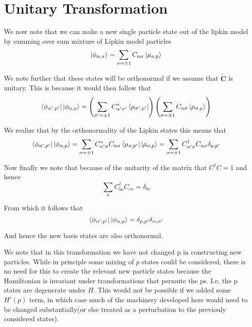 \documentclass[11pt]{article} %
\begin{document}
\section{Unitary Transformation}

We now note that we can make a new single particle state out of the lipkin model by summing over sum mixture of Lipkin model particles\\

\begin{equation} \ket{\phi_{\alpha,\sigma}}=\sum_{\sigma=\pm 1} C_{\alpha \sigma} \ket{\mu_{\sigma,p}}\end{equation}

We note further that these states will be orthonormal if we assume that $\mathbf{\tilde{C}}$ is unitary. This is because it would then follow that\\

\begin{equation}
\bra{\phi_{\alpha',p'}}\ket{\phi_{\alpha,p}}=\left(\sum_{\sigma'=\pm 1} C_{\alpha' \sigma'}^*\bra{\mu_{\sigma',p'}}\right)\left(\sum_{\sigma=\pm 1} C_{\alpha \sigma}\ket{\mu_{\sigma,p}}\right)\end{equation}

We realize that by the orthonormality of the Lipkin states this means that\\
\begin{equation}
\bra{\phi_{\alpha',p'}}\ket{\phi_{\alpha,p}}= \sum_{\sigma=\pm 1} C_{\alpha' \sigma}^* C_{\alpha \sigma} \bra{\mu_{\sigma,p'}} \ket{\mu_{\sigma,p}}=\sum_{\sigma=\pm 1} C_{\alpha' \sigma}^\dagger C_{\alpha \sigma} \delta_{p,p'}\end{equation}

Now finally we note that because of the unitarity of the matrix that $C^\dagger C=1$ and hence \\
\begin{equation} \sum_a C_{ b a}^\dagger C_{c a}=\delta_{bc} \end{equation}

From which it follows that
\begin{equation}
\bra{\phi_{\alpha',p'}}\ket{\phi_{\alpha,p}}=\delta_{p,p'}\delta_{\alpha,\alpha'}\end{equation}

And hence the new basis states are also orthonormal. 

We note that in this transformation we have not changed p in constructing new particles. While in principle some mixing of $p$ states could be considered, there is no need for this to create the relevant new particle states because the Hamiltonian is invariant under transformations that permute the ps. I.e. the p states are degenerate under $H$. This would not be possible if we added some $H'(p)$ term, in which case much of the machinery developed here would need to be changed substantially(or else treated as a perturbation to the previouly considered states).\\
\end{document}
